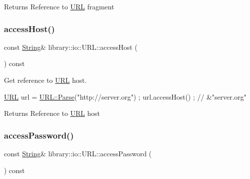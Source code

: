 \begin{DoxyReturn}{Returns}
Reference to \hyperlink{classlibrary_1_1io_1_1_u_r_l}{U\+RL} fragment 
\end{DoxyReturn}
\mbox{\label{classlibrary_1_1io_1_1_u_r_l_a14d80cd2a42f1337bdaf68cfcb84d8cf}} 
\subsubsection{\texorpdfstring{access\+Host()}{accessHost()}}
{\footnotesize\ttfamily const \hyperlink{namespacelibrary_1_1io_a7469b45835a4421045db344d6a5a1f85}{String}\& library\+::io\+::\+U\+R\+L\+::access\+Host (\begin{DoxyParamCaption}{ }\end{DoxyParamCaption}) const}



Get reference to \hyperlink{classlibrary_1_1io_1_1_u_r_l}{U\+RL} host. 


\begin{DoxyCode}
\hyperlink{classlibrary_1_1io_1_1_u_r_l_a7e9c070138a6dbd000ffb10b7cd8a5c4}{URL} url = \hyperlink{classlibrary_1_1io_1_1_u_r_l_a98cf42141cf75e1dd5362eb208a1e2bd}{URL::Parse}(\textcolor{stringliteral}{"http://server.org"}) ;
url.accessHost() ; \textcolor{comment}{// &"server.org"}
\end{DoxyCode}


\begin{DoxyReturn}{Returns}
Reference to \hyperlink{classlibrary_1_1io_1_1_u_r_l}{U\+RL} host 
\end{DoxyReturn}
\mbox{\label{classlibrary_1_1io_1_1_u_r_l_a23e9f7bc4564d7d37d5804e13abcfb92}} 
\subsubsection{\texorpdfstring{access\+Password()}{accessPassword()}}
{\footnotesize\ttfamily const \hyperlink{namespacelibrary_1_1io_a7469b45835a4421045db344d6a5a1f85}{String}\& library\+::io\+::\+U\+R\+L\+::access\+Password (\begin{DoxyParamCaption}{ }\end{DoxyParamCaption}) const}



